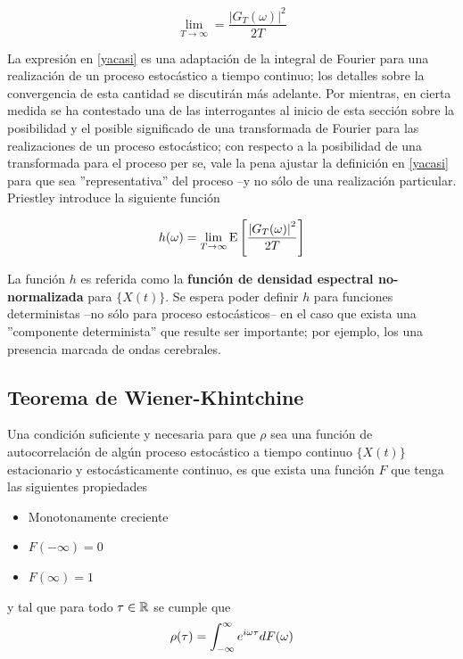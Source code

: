 \begin{equation}
\lim_{T\rightarrow{\infty}} = \frac{ \left| G_T(\omega) \right|^{2}}{2 T}
\label{yacasi}
\end{equation}

La expresi\'on en \ref{yacasi} es una adaptaci\'on de la integral de Fourier para una realizaci\'on
de un proceso estoc\'astico a tiempo continuo; los detalles sobre la convergencia de esta 
cantidad se discutir\'an m\'as adelante.
Por mientras, en cierta medida se ha contestado una de las interrogantes al inicio de esta 
secci\'on sobre la posibilidad y
el posible significado de una transformada de Fourier para las realizaciones de un proceso 
estoc\'astico; con respecto a la posibilidad de una transformada para el proceso per se, vale la 
pena
ajustar la definici\'on en \ref{yacasi} para que sea ''representativa'' del proceso --y no s\'olo
de una realizaci\'on particular. Priestley introduce la siguiente funci\'on

\begin{equation}
h(\omega) = \lim_{T\rightarrow \infty} \mathrm{E}\left[  \frac{ \left| G_T(\omega) \right|^{2}}{2 T}  \right]
\end{equation}

La funci\'on $h$ es referida como la \textbf{funci\'on de densidad espectral no-normalizada} para
$\{X(t)\}$. 
Se espera poder definir $h$ para funciones deterministas --no sólo para proceso estoc\'asticos--
en el caso que exista una ''componente determinista'' que resulte ser importante; por ejemplo, los
una presencia marcada de ondas cerebrales.

\subsection{Teorema de Wiener-Khintchine}

\begin{thrm}
Una condici\'on suficiente y necesaria para que $\rho$ sea una funci\'on de autocorrelaci\'on de 
alg\'un proceso estoc\'astico a tiempo continuo $\{X(t)\}$ estacionario y estoc\'asticamente 
continuo, es que exista una funci\'on $F$ que tenga las 
siguientes propiedades
\begin{itemize}
\item Monotonamente creciente
\item $F(-\infty) = 0$
\item $F(\infty) = 1$
\end{itemize}
y tal que para todo $\tau \in \mathbb{R}$ se cumple que
\begin{equation*}
\rho(\tau) = \int_{-\infty}^{\infty} e^{i \omega \tau} dF(\omega)
\end{equation*}
\end{thrm}

